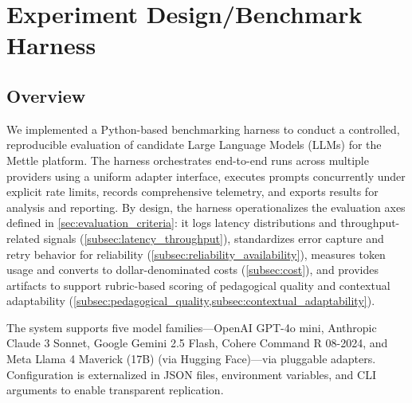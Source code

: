 \section{Experiment Design/Benchmark Harness}
\label{sec:benchmark_harness}

\subsection{Overview}
\label{subsec:overview}

We implemented a Python-based benchmarking harness to conduct a controlled, reproducible evaluation of candidate Large Language Models (LLMs) for the Mettle platform. The harness orchestrates end-to-end runs across multiple providers using a uniform adapter interface, executes prompts concurrently under explicit rate limits, records comprehensive telemetry, and exports results for analysis and reporting. By design, the harness operationalizes the evaluation axes defined in \cref{sec:evaluation_criteria}: it logs latency distributions and throughput-related signals (\cref{subsec:latency_throughput}), standardizes error capture and retry behavior for reliability (\cref{subsec:reliability_availability}), measures token usage and converts to dollar-denominated costs (\cref{subsec:cost}), and provides artifacts to support rubric-based scoring of pedagogical quality and contextual adaptability (\cref{subsec:pedagogical_quality,subsec:contextual_adaptability}).

The system supports five model families—OpenAI GPT-4o mini, Anthropic Claude 3 Sonnet, Google Gemini 2.5 Flash, Cohere Command R 08-2024, and Meta Llama 4 Maverick (17B) (via Hugging Face)—via pluggable adapters. Configuration is externalized in JSON files, environment variables, and CLI arguments to enable transparent replication.

